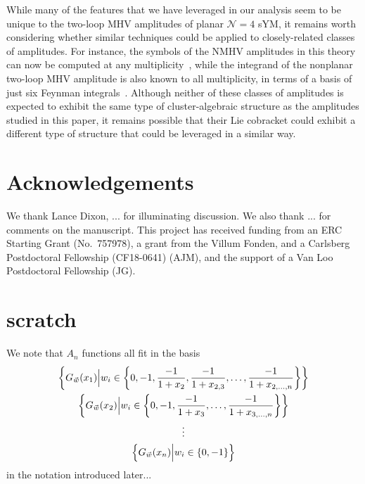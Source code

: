 \documentclass[11pt]{article}
\begin{document}
While many of the features that we have leveraged in our analysis seem to be unique to the two-loop MHV amplitudes of planar $\mathcal{N}=4$ sYM, it remains worth considering whether similar techniques could be applied to closely-related classes of amplitudes. For instance, the symbols of the NMHV amplitudes in this theory can now be computed at any multiplicity~\cite{Zhang:2019vnm,He:2020vob}, while the integrand of the nonplanar two-loop MHV amplitude is also known to all multiplicity, in terms of a basis of just six Feynman integrals~\cite{Bourjaily:2019iqr,Bourjaily:2019gqu}. Although neither of these classes of amplitudes is expected to exhibit the same type of cluster-algebraic structure as the amplitudes studied in this paper, it remains possible that their Lie cobracket could exhibit a different type of structure that could be leveraged in a similar way. 


\section*{Acknowledgements}

We thank Lance Dixon, ... for illuminating discussion. We also thank ... for comments on the manuscript. This project has received funding from an ERC Starting Grant \mbox{(No.\ 757978)}, a grant from the Villum Fonden, and a Carlsberg Postdoctoral Fellowship (CF18-0641) (AJM), and the support of a Van Loo Postdoctoral Fellowship (JG).

\iffalse

\section{scratch}

We note that $A_n$ functions all fit in the basis
\begin{gather}
\left\{G_{\vec{\hspace{.0cm} w}}(x_1) \Big| w_i \in \left\{0, - 1, \frac{-1}{1 + x_2}, \frac{-1}{1 + x_{2,3}}, \dots , \frac{-1}{1 + x_{2,\dots,n}} \right\} \right\} \nonumber \\
\left\{G_{\vec{\hspace{.0cm} w}}(x_2) \Big| w_i \in \left\{0, - 1, \frac{-1}{1 + x_3}, \dots , \frac{-1}{1 + x_{3,\dots,n}} \right\} \right\} \\
\vdots \nonumber \\ 
\left\{G_{\vec{\hspace{.0cm} w}}(x_n) \Big| w_i \in \left\{0, - 1 \right\} \right\} \nonumber
\end{gather}
in the notation introduced later...
\end{document}
